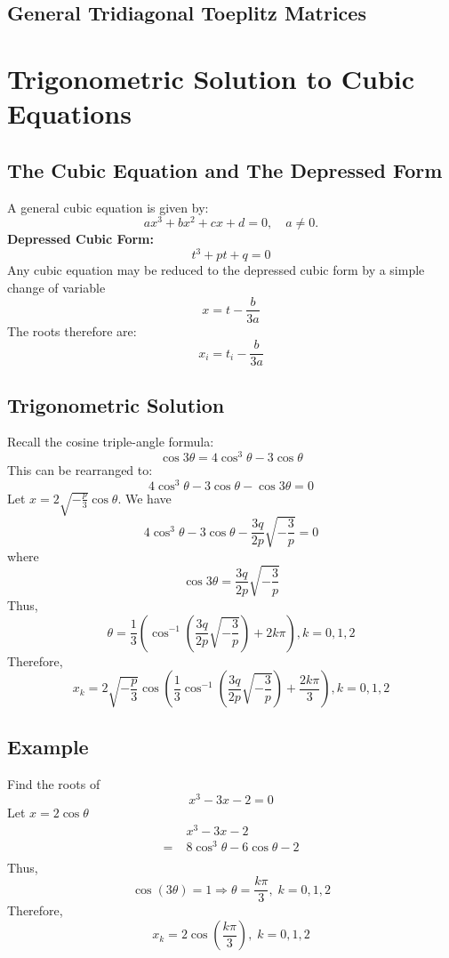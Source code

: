 \documentclass[11pt]{article}
\begin{document}
\subsection{General Tridiagonal Toeplitz Matrices}
\section{Trigonometric Solution to Cubic Equations}
\subsection{The Cubic Equation and The Depressed Form}
A general cubic equation is given by:
\[
    ax^3 + bx^2 + cx + d = 0, \quad a \neq 0.
\]
\textbf{Depressed Cubic Form:}
\[
    t^3 + pt + q = 0
\]
Any cubic equation may be reduced to the depressed cubic form by a simple change of variable
\[
    x = t - \frac{b}{3a}
\]
The roots therefore are:
\[
    x_i = t_i - \frac{b}{3a}
\]
\subsection{Trigonometric Solution}
Recall the cosine triple-angle formula:
\[
    \cos 3\theta = 4\cos^3 \theta - 3\cos \theta
\]
This can be rearranged to:
\[
    4\cos^3 \theta - 3\cos \theta - \cos3\theta = 0
\]
Let $\displaystyle x = 2\sqrt{-\frac{p}{3}}\cos\theta$. We have
\[
    4\cos^3\theta - 3\cos\theta - \frac{3q}{2p}\sqrt{-\frac{3}{p}} = 0
\]
where
\[
    \cos3\theta = \frac{3q}{2p}\sqrt{-\frac{3}{p}}
\]
Thus,
\[
    \theta = \frac{1}{3}\left(\cos^{-1}\left(\frac{3q}{2p}\sqrt{-\frac{3}{p}}\right) + 2k\pi\right), k = 0,1,2
\]
Therefore,
\[
    x_k = 2\sqrt{-\frac{p}{3}}\cos\left(\frac{1}{3}\cos^{-1}\left(\frac{3q}{2p}\sqrt{-\frac{3}{p}}\right) + \frac{2k\pi}{3}\right), k = 0,1,2
\]
\subsection{Example}
Find the roots of
\[
    x^3 - 3x - 2 = 0
\]
Let $\displaystyle x = 2\cos\theta$
\begin{align*}
    &x^3 - 3x - 2\\
    =\;&8\cos^3\theta - 6\cos\theta -2\\
\end{align*}
Thus,
\[
    \cos(3\theta) = 1\Rightarrow\theta = \frac{k\pi}{3},\;k = 0,1,2
\]
Therefore, 
\[
    x_k = 2\cos(\frac{k\pi}{3}), \;k = 0,1,2
\]
\end{document}
